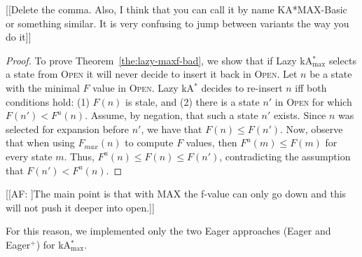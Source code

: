 \documentclass[twoside,11pt]{article}
\newcommand{\kastar}{kA$^*$\xspace}
\newcommand{\kastarvar}[1]{\textup{kA}$^*_{#1}$\xspace}
\newcommand{\kastarmin}{\kastarvar{\min}}
\newcommand{\kastarmax}{\kastarvar{\max}}
\newcommand{\maxf}{$F_{max}(n)$\xspace}
\newcommand{\open}{\textsc{Open}\xspace}
\begin{document}
[[Delete the comma. Also, I think that you can call it by name KA*MAX-Basic or something similar. It is very confusing to jump between variants the way you do it]]

\begin{proof}
  To prove Theorem~\ref{the:lazy-maxf-bad}, we show that if Lazy \kastarmax selects a state from \open it will never decide to insert it back in \open.
  Let $n$ be a state with the minimal $F$ value in \open.
  Lazy \kastar decides to re-insert $n$ iff both conditions hold: (1) $F(n)$ is stale, and
  (2) there is a state $n'$ in \open for which $F(n')<F^u(n)$. %
  Assume, by negation, that such a state $n'$ exists.
  Since $n$ was selected for expansion before $n'$, we have that $F(n)\leq F(n')$.
  Now, observe that when using \maxf to compute $F$ values, then $F^u(m)\leq F(m)$ for every state $m$.
  Thus, $F^u(n)\leq F(n) \leq F(n')$, contradicting the assumption that $F(n')<F^u(n)$.
\end{proof}

[[AF: ]The main point is that with MAX the f-value can only go down and this will not push it deeper into open.]]

For this reason, we implemented only the two Eager approaches (Eager and Eager$^+$) for \kastarmax.

\end{document}
